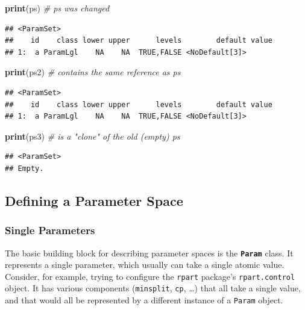 \documentclass[]{scrbook}
\newenvironment{Shaded}{\begin{snugshade}}{\end{snugshade}}
\newcommand{\CommentTok}[1]{\textcolor[rgb]{0.56,0.35,0.01}{\textit{#1}}}
\newcommand{\KeywordTok}[1]{\textcolor[rgb]{0.13,0.29,0.53}{\textbf{#1}}}
\newcommand{\NormalTok}[1]{#1}
\renewenvironment{Shaded} {\begin{snugshade}\small} {\end{snugshade}}
\begin{document}
\begin{Shaded}
\begin{Highlighting}[]
\KeywordTok{print}\NormalTok{(ps)  }\CommentTok{# ps was changed}
\end{Highlighting}
\end{Shaded}

\begin{verbatim}
## <ParamSet>
##    id    class lower upper      levels        default value
## 1:  a ParamLgl    NA    NA  TRUE,FALSE <NoDefault[3]>
\end{verbatim}

\begin{Shaded}
\begin{Highlighting}[]
\KeywordTok{print}\NormalTok{(ps2) }\CommentTok{# contains the same reference as ps}
\end{Highlighting}
\end{Shaded}

\begin{verbatim}
## <ParamSet>
##    id    class lower upper      levels        default value
## 1:  a ParamLgl    NA    NA  TRUE,FALSE <NoDefault[3]>
\end{verbatim}

\begin{Shaded}
\begin{Highlighting}[]
\KeywordTok{print}\NormalTok{(ps3) }\CommentTok{# is a "clone" of the old (empty) ps}
\end{Highlighting}
\end{Shaded}

\begin{verbatim}
## <ParamSet>
## Empty.
\end{verbatim}

\hypertarget{defining-a-parameter-space}{%
\subsection{Defining a Parameter Space}\label{defining-a-parameter-space}}

\hypertarget{single-parameters}{%
\subsubsection{Single Parameters}\label{single-parameters}}

The basic building block for describing parameter spaces is the \textbf{\texttt{Param}} class.
It represents a single parameter, which usually can take a single atomic value.
Consider, for example, trying to configure the \texttt{rpart} package's \texttt{rpart.control} object.
It has various components (\texttt{minsplit}, \texttt{cp}, \ldots{}) that all take a single value, and that would all be represented by a different instance of a \texttt{Param} object.
\end{document}
